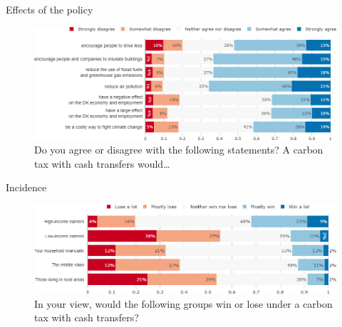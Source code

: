 \documentclass[aspectratio=169,9pt,dvipsnames]{beamer}
\begin{document}
\begin{frame}{Effects of the policy}%
%

\begin{figure}[h!]
\centering
\caption{Do you agree or disagree with the following statements? A carbon tax with cash transfers would…}
\includegraphics[width=\textwidth]{../figures/DK/tax_transfers_effect_DK.png}
\end{figure}
\end{frame}

\begin{frame}{Incidence}%
\begin{figure}[h!]
\centering
\caption{In your view, would the following groups win or lose under a carbon tax with cash transfers?}
\includegraphics[width=\textwidth]{../figures/DK/tax_transfers_win_lose_DK.png}
\end{figure}
\end{frame}
\end{document}
